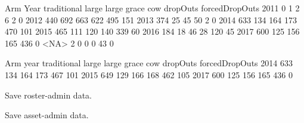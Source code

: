 \begin{Schunk}
\begin{Soutput}
      Arm
Year   traditional large large grace cow dropOuts forcedDropOuts
  2011           0     1           2   6        2              0
  2012         440   692         663 622      495            151
  2013         374    25          45  50        2              0
  2014         633   134         164 173      470            101
  2015         465   111         120 140      339             60
  2016         184    18          46  28      120             45
  2017         600   125         156 165      436              0
  <NA>           2     0           0   0       43              0
\end{Soutput}
\begin{Soutput}
      Arm
year   traditional large large grace cow dropOuts forcedDropOuts
  2014         633   134         164 173      467            101
  2015         649   129         166 168      462            105
  2017         600   125         156 165      436              0
\end{Soutput}
\end{Schunk}
Save roster-admin data.


Save asset-admin data.

